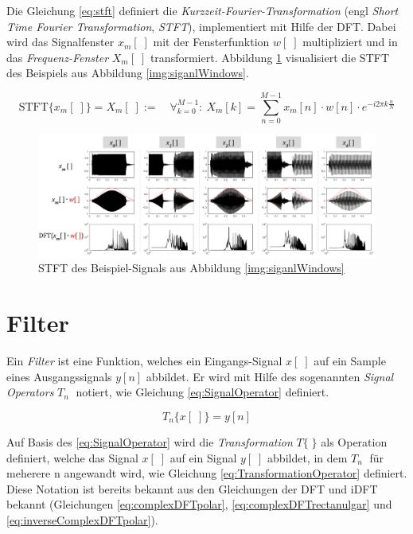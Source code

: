 Die Gleichung \ref{eq:stft} definiert die \emph{Kurzzeit-Fourier-Transformation} (engl \emph{Short Time Fourier Transformation}, \emph{STFT}), implementiert mit Hilfe der DFT. Dabei wird das Signalfenster $x_m[\;]$ mit der Fensterfunktion $w[\;]$ multipliziert und in das \emph{Frequenz-Fenster} $X_m[\;]$ transformiert.\cite{stft} Abbildung \ref{img:stft02} visualisiert die STFT des Beispiels aus Abbildung \ref{img:siganlWindows}.

 \begin{equation}
\text{STFT}\{x_m[\;]\} = X_m[\;] := \quad \mathop{\forall}_{k = 0}^{M-1} :\ X_m[k] = \sum_{n=0}^{M-1} x_m[n] \cdot w[n] \cdot e^{-i 2\pi k \frac{n}{N}}
\label{eq:stft}
\end{equation}

 \begin{figure}[h]
	\centering
	\includegraphics[width=1\textwidth]{bilder/stft03.png}
	\caption{STFT des Beispiel-Signals aus Abbildung \ref{img:siganlWindows}}
	\label{img:stft02}
\end{figure}


\section{Filter}
\label{sec:filter}

Ein \emph{Filter} ist eine Funktion, welches ein Eingangs-Signal $x[\;]$ auf ein Sample eines Ausgangssignals $y[n]$ abbildet. Er wird mit Hilfe des sogenannten \emph{Signal Operators} $T_n{\;}$ notiert, wie Gleichung \ref{eq:SignalOperator} definiert. \cite[\glqq Definition of a Filter\grqq ]{introductionToFilters}

 \begin{equation}
T_n \{ x[\;] \} = y[n]
\label{eq:SignalOperator}
\end{equation}

Auf Basis des \ref{eq:SignalOperator} wird die \emph{Transformation} $T\{ \; \}$ als Operation definiert, welche das Signal $x[\;]$ auf ein Signal $y[\;]$ abbildet, in dem $T_n{\;}$ für meherere n angewandt wird, wie Gleichung \ref{eq:TransformationOperator} definiert. Diese Notation ist bereits bekannt aus den Gleichungen der DFT und iDFT bekannt (Gleichungen \ref{eq:complexDFTpolar}, \ref{eq:complexDFTrectanulgar} und \ref{eq:inverseComplexDFTpolar}). \cite[\glqq Definition of a Filter\grqq ]{introductionToFilters}


